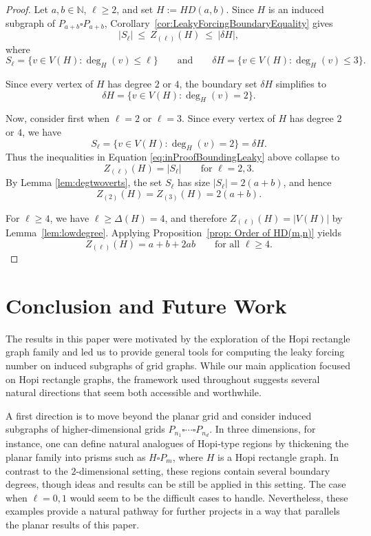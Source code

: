 \documentclass[11pt]{article}
\theoremstyle{plain} \newtheorem{question}{Question}
\theoremstyle{definition}
\begin{document}
\begin{proof}
Let $a,b\in\mathbb{N}$, $\ell\ge 2$, and set $H:=HD(a,b)$. Since $H$ is an induced subgraph of
$P_{a+b}\square P_{a+b}$, Corollary~\ref{cor:LeakyForcingBoundaryEquality} gives
\begin{equation}\label{eq:inProofBoundingLeaky}
    |S_\ell|\ \le\ Z_{(\ell)}(H)\ \le\ |\delta H|,
\end{equation}
where
\[
S_\ell=\{v\in V(H):\deg_H(v)\le \ell\}
\qquad\text{and}\qquad
\delta H=\{v\in V(H):\deg_H(v)\le 3\}.
\]

\noindent Since every vertex of $H$ has degree $2$ or $4$, the boundary set $\delta H$ simplifies to
\[
\delta H=\{v\in V(H):\deg_H(v)=2\}.
\]

\noindent Now, consider first when $\ell=2$ or $\ell=3$. Since every vertex of $H$ has degree $2$ or $4$, we have
\[
S_\ell=\{v\in V(H):\deg_H(v)=2\}=\delta H.
\]
Thus the inequalities in Equation \ref{eq:inProofBoundingLeaky} above collapse to
\[
Z_{(\ell)}(H)=|S_\ell| \qquad\text{for }\ell=2,3.
\]
By Lemma \ref{lem:degtwoverts}, the set $S_\ell$ has size $|S_\ell|=2(a+b)$, and hence
\[
Z_{(2)}(H)=Z_{(3)}(H)=2(a+b).
\]

For $\ell\ge 4$, we have $\ell\ge \Delta(H)=4$, and therefore $Z_{(\ell)}(H)=|V(H)|$ by
Lemma~\ref{lem:lowdegree}. Applying Proposition~\ref{prop: Order of HD(m,n)} yields
\[
Z_{(\ell)}(H)=a+b+2ab \qquad\text{for all }\ell\ge 4.
\]
\end{proof}





\section{Conclusion and Future Work}\label{sec:conclusion}\label{sec:FutureWork}
\qquad The results in this paper were motivated by the exploration of the Hopi rectangle graph family and led us to provide general tools for computing the leaky forcing number on induced subgraphs of grid graphs. While our main application focused on Hopi rectangle graphs, the framework used throughout suggests several natural directions that seem both accessible and worthwhile.

\qquad A first direction is to move beyond the planar grid and consider induced subgraphs of higher-dimensional grids $P_{n_1}\square\cdots\square P_{n_d}$. In three dimensions, for instance, one can define natural analogues of Hopi-type regions by thickening the planar family into prisms such as $H\square P_m$, where $H$ is a Hopi rectangle graph. In contrast to the $2$-dimensional setting, these regions contain several boundary degrees, though ideas and results can be still be applied in this setting. The case when $\ell=0,1$ would seem to be the difficult cases to handle. Nevertheless, these examples provide a natural pathway for further projects in a way that parallels the planar results of this paper.
\end{document}
